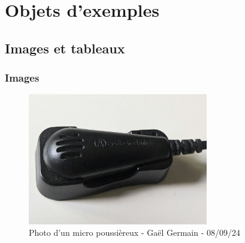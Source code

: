\section{Objets d'exemples}
\subsection{Images et tableaux}
\subsubsection{Images}

\begin{figure}[h] 
    \caption{Photo d'un micro poussièreux - Gaël Germain - 08/09/24}
    \centering
    \includegraphics[width=0.7\textwidth]{images/micro_poussiereux.jpg}
\end{figure}


